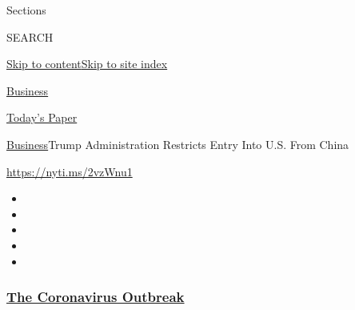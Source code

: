 Sections

SEARCH

\protect\hyperlink{site-content}{Skip to
content}\protect\hyperlink{site-index}{Skip to site index}

\href{https://www.nytimes3xbfgragh.onion/section/business}{Business}

\href{https://myaccount.nytimes3xbfgragh.onion/auth/login?response_type=cookie\&client_id=vi}{}

\href{https://www.nytimes3xbfgragh.onion/section/todayspaper}{Today's
Paper}

\href{/section/business}{Business}\textbar{}Trump Administration
Restricts Entry Into U.S. From China

\url{https://nyti.ms/2vzWnu1}

\begin{itemize}
\item
\item
\item
\item
\item
\end{itemize}

\hypertarget{the-coronavirus-outbreak}{%
\subsubsection{\texorpdfstring{\href{https://www.nytimes3xbfgragh.onion/news-event/coronavirus?name=styln-coronavirus-markets\&region=TOP_BANNER\&block=storyline_menu_recirc\&action=click\&pgtype=Article\&impression_id=4e3f88b0-f4c6-11ea-886e-25385b9a717d\&variant=undefined}{The
Coronavirus
Outbreak}}{The Coronavirus Outbreak}}\label{the-coronavirus-outbreak}}

